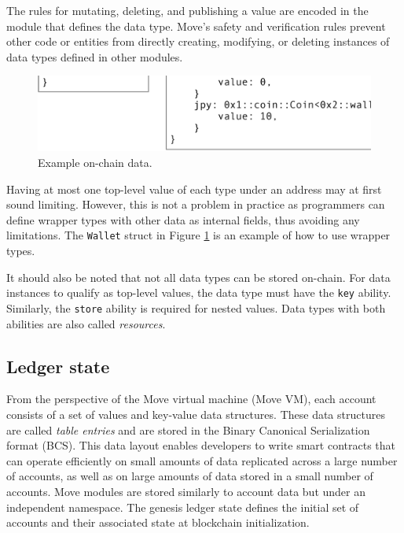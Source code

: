 \documentclass{article}
\begin{document}
The rules for mutating, deleting, and publishing a value are encoded in the module that defines the data type. Move’s safety and verification rules prevent other code or entities from directly creating, modifying, or deleting instances of data types defined in other modules.

\begin{figure}
\centering
\includegraphics[width=1.0\textwidth]{move_2.eps}
\caption{\label{fig:move_data}Example on-chain data.}
\end{figure}

Having at most one top-level value of each type under an address may at first sound limiting. However, this is not a problem in practice as programmers can define wrapper types with other data as internal fields, thus avoiding any limitations. The \texttt{Wallet} struct in Figure \ref{fig:move_data} is an example of how to use wrapper types.

It should also be noted that not all data types can be stored on-chain. For data instances to qualify as top-level values, the data type must have the \texttt{key} ability. Similarly, the \texttt{store} ability is required for nested values. Data types with both abilities are also called \emph{resources}.

\subsection{Ledger state}
\label{sub:ledger_state}

From the perspective of the Move virtual machine (Move VM), each account consists of a set of values and key-value data structures. These data structures are called \emph{table entries} and are stored in the Binary Canonical Serialization format (BCS). This data layout enables developers to write smart contracts that can operate efficiently on small amounts of data replicated across a large number of accounts, as well as on large amounts of data stored in a small number of accounts. Move modules are stored similarly to account data but under an independent namespace. The genesis ledger state defines the initial set of accounts and their associated state at blockchain initialization.
\end{document}
